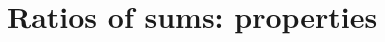 \documentclass[11pt,draft]{article}
\newcommand{\yv}{\mathbf{y}}
\newcommand{\yvt}{\tilde{\yv}}
\newcommand{\one}{\boldsymbol{1}}
\begin{document}

\section{Ratios of sums: properties}
\end{document}
